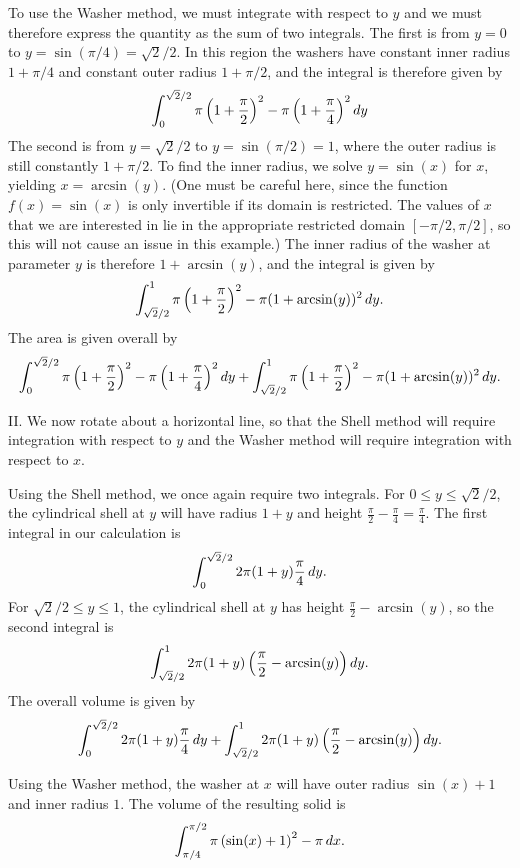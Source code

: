 \documentclass[]{ximera}
\begin{document}
\begin{freeResponse}
To use the Washer method, we must integrate with respect to $y$ and we must therefore express the quantity as the sum of two integrals. The first is from $y=0$ to $y=\sin(\pi/4)=\sqrt{2}/2$. In this region the washers have constant inner radius $1+\pi/4$ and constant outer radius $1+\pi/2$, and the integral is therefore given by
$$
\int_0^{\sqrt{2}/2} \pi \left(1+\frac{\pi}{2}\right)^2 - \pi \left(1+\frac{\pi}{4}\right)^2  \mathop{}\!d y
$$
The second is from $y = \sqrt{2}/2$ to $y=\sin(\pi/2) =1$, where the outer radius is still constantly $1+\pi/2$. To find the inner radius, we solve $y=\sin (x)$ for $x$, yielding $x = \arcsin (y)$. (One must be careful here, since the function $f(x) = \sin(x)$ is only invertible if its domain is restricted. The values of $x$ that we are interested in lie in the appropriate restricted domain $[-\pi/2,\pi/2]$, so this will not cause an issue in this example.) The inner radius of the washer at parameter $y$ is therefore $1+\arcsin(y)$, and the integral is given by
$$
\int_{\sqrt{2}/2}^1 \pi \left(1+ \frac{\pi}{2}\right)^2 - \pi (1+\arcsin(y))^2 \mathop{}\!d y.
$$
The area is given overall by
$$
\int_0^{\sqrt{2}/2} \pi \left(1+\frac{\pi}{2}\right)^2 - \pi \left(1+\frac{\pi}{4}\right)^2  \mathop{}\!d y + \int_{\sqrt{2}/2}^1 \pi \left(1+ \frac{\pi}{2}\right)^2 - \pi (1+\arcsin(y))^2 \mathop{}\!d y.
$$

II. We now rotate about a horizontal line, so that the Shell method will require integration with respect to $y$ and the Washer method will require integration with respect to $x$. 

Using the Shell method, we once again require two integrals. For $0 \leq y \leq \sqrt{2}/2$, the cylindrical shell at $y$ will have radius $1+y$ and height $\frac{\pi}{2}-\frac{\pi}{4} = \frac{\pi}{4}$. The first integral in our calculation is
$$
\int_0^{\sqrt{2}/2} 2 \pi (1+y) \frac{\pi}{4} \mathop{}\!d y.
$$
For $\sqrt{2}/2 \leq y \leq 1$, the cylindrical shell at $y$ has height $\frac{\pi}{2} - \arcsin(y)$, so the second integral is
$$
\int_{\sqrt{2}/2}^1 2 \pi (1+y)\left(\frac{\pi}{2} - \arcsin(y)\right) \mathop{}\!d y.
$$
The overall volume is given by
$$
\int_0^{\sqrt{2}/2} 2 \pi (1+y) \frac{\pi}{4} \mathop{}\!d y + \int_{\sqrt{2}/2}^1 2 \pi (1+y)\left(\frac{\pi}{2} - \arcsin(y)\right) \mathop{}\!d y.
$$

Using the Washer method, the washer at $x$ will have outer radius $\sin (x) + 1$ and inner radius $1$. The volume of the resulting solid is
$$
\int_{\pi/4}^{\pi/2} \pi \left(\sin (x) + 1\right)^2 - \pi \mathop{}\!d x.
$$

\end{freeResponse}
\end{document}
